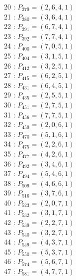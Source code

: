 \documentclass{article}
\begin{document}
{\begin{multicols}{2}
20 : $P_{379}=( 2, 6, 4, 1 )$\\
21 : $P_{380}=( 3, 6, 4, 1 )$\\
22 : $P_{391}=( 6, 7, 4, 1 )$\\
23 : $P_{392}=( 7, 7, 4, 1 )$\\
24 : $P_{400}=( 7, 0, 5, 1 )$\\
25 : $P_{404}=( 3, 1, 5, 1 )$\\
26 : $P_{412}=( 3, 2, 5, 1 )$\\
27 : $P_{415}=( 6, 2, 5, 1 )$\\
28 : $P_{431}=( 6, 4, 5, 1 )$\\
29 : $P_{435}=( 2, 5, 5, 1 )$\\
30 : $P_{451}=( 2, 7, 5, 1 )$\\
31 : $P_{456}=( 7, 7, 5, 1 )$\\
32 : $P_{459}=( 2, 0, 6, 1 )$\\
33 : $P_{470}=( 5, 1, 6, 1 )$\\
34 : $P_{475}=( 2, 2, 6, 1 )$\\
35 : $P_{477}=( 4, 2, 6, 1 )$\\
36 : $P_{492}=( 3, 4, 6, 1 )$\\
37 : $P_{494}=( 5, 4, 6, 1 )$\\
38 : $P_{509}=( 4, 6, 6, 1 )$\\
39 : $P_{516}=( 3, 7, 6, 1 )$\\
40 : $P_{523}=( 2, 0, 7, 1 )$\\
41 : $P_{532}=( 3, 1, 7, 1 )$\\
42 : $P_{539}=( 2, 2, 7, 1 )$\\
43 : $P_{540}=( 3, 2, 7, 1 )$\\
44 : $P_{549}=( 4, 3, 7, 1 )$\\
45 : $P_{550}=( 5, 3, 7, 1 )$\\
46 : $P_{574}=( 5, 6, 7, 1 )$\\
47 : $P_{581}=( 4, 7, 7, 1 )$\\
\end{multicols}
}
\end{document}
